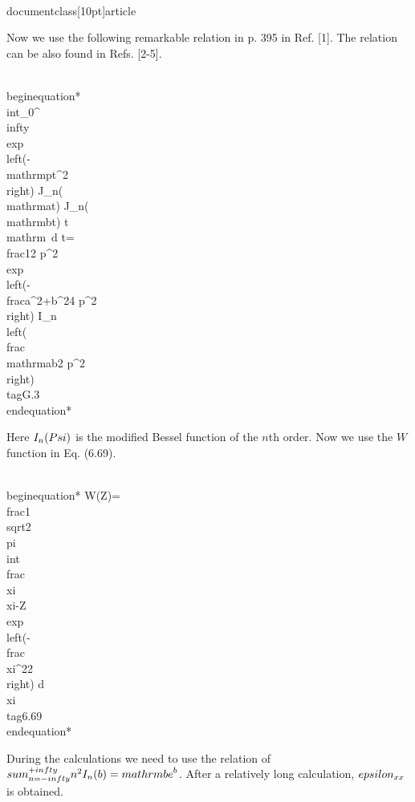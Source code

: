 \\documentclass[10pt]{article}
\begin{document}
{{{{{{Now we use the following remarkable relation in p. 395 in Ref. [1]. The relation can be also found in Refs. [2-5].


\\begin{equation*}
\\int_{0}^{\\infty} \\exp \\left(-\\mathrm{pt}^{2}\\right) J_{n}(\\mathrm{at}) J_{n}(\\mathrm{bt}) t \\mathrm{~d} t=\\frac{1}{2 p^{2}} \\exp \\left(-\\frac{a^{2}+b^{2}}{4 p^{2}}\\right) I_{n}\\left(\\frac{\\mathrm{ab}}{2 p^{2}}\\right) \\tag{G.3}
\\end{equation*}


Here $I_{n}(\\Psi)$ is the modified Bessel function of the $n$th order. Now we use the $W$ function in Eq. (6.69).


\\begin{equation*}
W(Z)=\\frac{1}{\\sqrt{2 \\pi}} \\int \\frac{\\xi}{\\xi-Z} \\exp \\left(-\\frac{\\xi^{2}}{2}\\right) d \\xi \\tag{6.69}
\\end{equation*}


During the calculations we need to use the relation of $\\sum_{n=-\\infty}^{+\\infty} n^{2} I_{n}(b)=\\mathrm{be}^{b}$. After a relatively long calculation, $\\epsilon_{x x}$ is obtained.

}}}}}}
\end{document}
